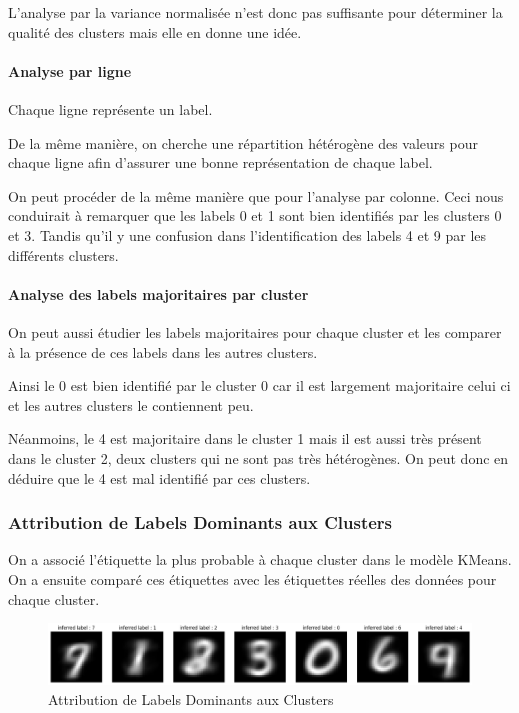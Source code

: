 \documentclass[french,a4paper,18pt]{article}
\begin{document}
L'analyse par la variance normalisée n'est donc pas suffisante pour déterminer la qualité des clusters mais 
elle en donne une idée.

\paragraph{Analyse par ligne} 
Chaque ligne représente un label.

De la même manière, on cherche une répartition hétérogène des valeurs pour chaque ligne
afin d'assurer une bonne représentation de chaque label.

On peut procéder de la même manière que pour l'analyse par colonne. 
Ceci nous conduirait à remarquer que les labels 0 et 1 sont bien identifiés
par les clusters 0 et 3.
Tandis qu'il y une confusion dans l'identification des labels 4 et 9 par les différents clusters.

\paragraph{Analyse des labels majoritaires par cluster} 

On peut aussi étudier les labels majoritaires pour chaque cluster 
et les comparer à la présence de ces labels dans les autres clusters.

Ainsi le 0 est bien identifié par le cluster 0 car il est largement majoritaire celui ci 
et les autres clusters le contiennent peu.

Néanmoins, le 4 est majoritaire dans le cluster 1 mais il est aussi très présent dans le cluster 2,
deux clusters qui ne sont pas très hétérogènes.
On peut donc en déduire que le 4 est mal identifié par ces clusters.

\subsubsection{Attribution de Labels Dominants aux Clusters}

On a associé l'étiquette la plus probable à chaque cluster dans le modèle KMeans.
On a ensuite comparé ces étiquettes avec les étiquettes réelles des données pour chaque cluster.

\begin{figure}[h!]
    \centering
    \includegraphics[scale=0.2]{../images/mnist_kmeans_inferred_labels.png}
    \caption{Attribution de Labels Dominants aux Clusters}\label{fig:mnist_kmeans_labels}
\end{figure}
\end{document}
